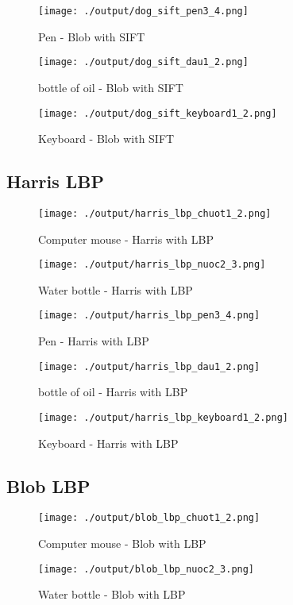 \documentclass[a4paper, 12pt]{article}
\begin{document}
\begin{figure}[H]
	\centering
	\texttt{[image: ./output/dog\_sift\_pen3\_4.png]}
	\caption[]{Pen - Blob with SIFT }
\end{figure}

\begin{figure}[H]
	\centering
	\texttt{[image: ./output/dog\_sift\_dau1\_2.png]}
	\caption[]{bottle of oil - Blob with SIFT }
\end{figure}

\begin{figure}[H]
	\centering
	\texttt{[image: ./output/dog\_sift\_keyboard1\_2.png]}
	\caption[]{Keyboard - Blob with SIFT }
\end{figure}

\subsection{Harris LBP}
\begin{figure}[H]
	\centering
	\texttt{[image: ./output/harris\_lbp\_chuot1\_2.png]}
	\caption[]{Computer mouse - Harris with LBP }
	\label{fig:harris_sift_chuot2_3.png}
\end{figure}
\begin{figure}[H]
	\centering
	\texttt{[image: ./output/harris\_lbp\_nuoc2\_3.png]}
	\caption[]{Water bottle - Harris with LBP }
	\label{fig:harris_sift_nuoc2_3.png}
\end{figure}

\begin{figure}[H]
	\centering
	\texttt{[image: ./output/harris\_lbp\_pen3\_4.png]}
	\caption[]{Pen - Harris with LBP }
\end{figure}

\begin{figure}[H]
	\centering
	\texttt{[image: ./output/harris\_lbp\_dau1\_2.png]}
	\caption[]{bottle of oil - Harris with LBP }
\end{figure}

\begin{figure}[H]
	\centering
	\texttt{[image: ./output/harris\_lbp\_keyboard1\_2.png]}
	\caption[]{Keyboard - Harris with LBP }
\end{figure}

\subsection{Blob LBP}
\begin{figure}[H]
	\centering
	\texttt{[image: ./output/blob\_lbp\_chuot1\_2.png]}
	\caption[]{Computer mouse - Blob with LBP }
	\label{fig:harris_sift_chuot2_3.png}
\end{figure}
\begin{figure}[H]
	\centering
	\texttt{[image: ./output/blob\_lbp\_nuoc2\_3.png]}
	\caption[]{Water bottle - Blob with LBP }
	\label{fig:harris_sift_nuoc2_3.png}
\end{figure}
\end{document}
